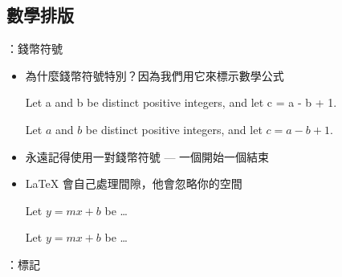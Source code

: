 \documentclass{beamer}
\begin{document}
\subsection{數學排版}
\begin{frame}[fragile]{\insertsubsection{}：錢幣符號}
\begin{itemize}
\item 為什麼錢幣符號\keystrokebftt{\$}特別？因為我們用它來標示數學公式\\[1ex]
\begin{exampletwouptiny}
Let a and b be distinct positive
integers, and let c = a - b + 1.

Let $a$ and $b$ be distinct positive
integers, and let $c = a - b + 1$.
\end{exampletwouptiny}
\item 永遠記得使用一對錢幣符號 --- 一個開始一個結束
\item \LaTeX{} 會自己處理間隙，他會忽略你的空間
\begin{exampletwouptiny}
Let $y=mx+b$ be \ldots

Let $y = m x + b$ be \ldots
\end{exampletwouptiny}
\end{itemize}
\end{frame}

\begin{frame}[fragile]{\insertsubsection{}：標記}
\end{frame}
\end{document}
